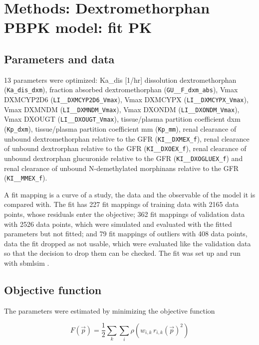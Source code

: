 \section{Methods: Dextromethorphan PBPK model: fit PK}

\subsection{Parameters and data}

13 parameters were optimized: Ka\_dis [1/hr] dissolution dextromethorphan (\texttt{Ka\_dis\_dxm}), fraction absorbed dextromethorphan (\texttt{GU\_\_F\_dxm\_abs}), Vmax DXMCYP2D6 (\texttt{LI\_\_DXMCYP2D6\_Vmax}), Vmax DXMCYPX (\texttt{LI\_\_DXMCYPX\_Vmax}), Vmax DXMNDM (\texttt{LI\_\_DXMNDM\_Vmax}), Vmax DXONDM (\texttt{LI\_\_DXONDM\_Vmax}), Vmax DXOUGT (\texttt{LI\_\_DXOUGT\_Vmax}), tissue/plasma partition coefficient dxm (\texttt{Kp\_dxm}), tissue/plasma partition coefficient mm (\texttt{Kp\_mm}), renal clearance of unbound dextromethorphan relative to the GFR (\texttt{KI\_\_DXMEX\_f}), renal clearance of unbound dextrorphan relative to the GFR (\texttt{KI\_\_DXOEX\_f}), renal clearance of unbound dextrorphan glucuronide relative to the GFR (\texttt{KI\_\_DXOGLUEX\_f}) and renal clearance of unbound N-demethylated morphinans relative to the GFR (\texttt{KI\_\_MMEX\_f}).

A fit mapping is a curve of a study, the data and the observable of the model it is compared with. The fit has 227 fit mappings of training data with 2165 data points, whose residuals enter the objective; 362 fit mappings of validation data with 2526 data points, which were simulated and evaluated with the fitted parameters but not fitted; and 79 fit mappings of outliers with 408 data points, data the fit dropped as not usable, which were evaluated like the validation data so that the decision to drop them can be checked. The fit was set up and run with sbmlsim \cite{Koenig2026_sbmlsim}.

\subsection{Objective function}

The parameters were estimated by minimizing the objective function

\begin{equation}
F(\vec{p}) = \frac{1}{2} \sum_{k} \sum_{i} \rho\left(w_{i,k}\, r_{i,k}(\vec{p})^2\right)
\end{equation}

